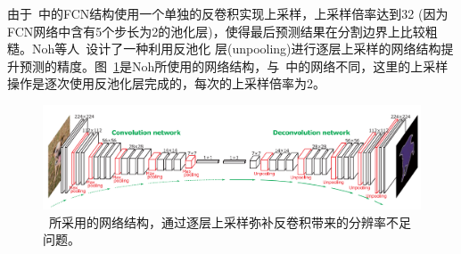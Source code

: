 \documentclass[UTF8]{ctexart}
\numberwithin{equation}{section} %
\numberwithin{table}{section} %
\begin{document}
由于~\cite{long2015fully}中的FCN结构使用一个单独的反卷积实现上采样，上采样倍率达到32 (因为FCN网络中含有5个步长为2的池化层)，使得最后预测结果在分割边界上比较粗糙。Noh等人~\cite{noh2015learning}设计了一种利用反池化
层(unpooling)进行逐层上采样的网络结构提升预测的精度。图~\ref{fig:noh_deconv}是Noh所使用的网络结构，与~\cite{long2015fully}中的网络不同，这里的上采样操作是逐次使用反池化层完成的，每次的上采样倍率为2。
\begin{figure}[!htb]
\centering
\includegraphics[scale=0.35]{figures/deconv_arch.png}
\caption{~\cite{noh2015learning}所采用的网络结构，通过逐层上采样弥补反卷积带来的分辨率不足问题。}
\label{fig:noh_deconv}
\end{figure}
\end{document}
